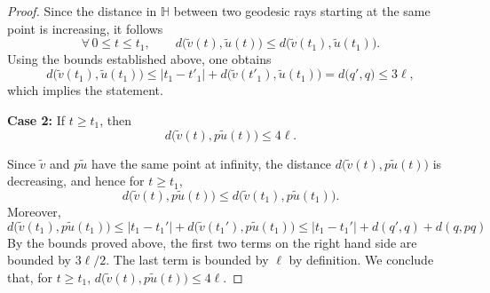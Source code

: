 \documentclass[a4paper,english,reqno]{amsart}
\theoremstyle{definition}
\numberwithin{equation}{section}
\begin{document}
\begin{proof}
 Since the distance in $\mathbb{H}$ between two geodesic rays starting at the same point is increasing, it follows 
 \[
  	\forall\,0\le t\le t_1,\qquad
  	d\bigl(\tilde v(t),\tilde u(t)\bigr)\le d\bigl(\tilde v(t_1),\tilde u(t_1)\bigr).
  	\]
Using the bounds established above, one obtains
 	\[
 	d\bigl(\tilde v(t_1),\tilde u(t_1)\bigr) \le 
 	|t_1 - t'_1 | + d\bigl(\tilde v(t'_1),\tilde u(t_1)\bigr) = d\bigl(q',q\bigr) \le
 	3\ell,
  	\]
which implies the statement.
 	
% 
 	
 	\smallskip
 	\noindent\textbf{Case 2:} If $ t\ge  t_1$, then 
 	\[
 	d\bigl(\tilde v(t), p \tilde u(t)\bigr)\le 4\ell.
 	\] 
 	
 	Since $\tilde v$ and $p \tilde u$ have the same point at infinity, the distance $d\bigl(\tilde v(t), p \tilde u(t)\bigr)$ is decreasing, and hence for $t\ge t_1$,
 	\[
 	d\bigl(\tilde v(t), p\tilde u(t)\bigr)
 	\le d\bigl(\tilde v(t_1),p \tilde u(t_1)\bigr).
 	\]
 	Moreover,
 	\[
 	d\bigl(\tilde v(t_1), p \tilde u(t_1)\bigr)
 	\le |t_1-t_1'| + d\bigl(\tilde v(t_1'), p \tilde u(t_1) \bigr) \le |t_1-t_1'| + d(q', q) + d(q,pq)
 	\]
 	By the bounds proved above, the first two terms on the right hand side are bounded by $3\ell/2$. The last term is bounded by $\ell$ by definition.
 	We conclude that, for $t\ge t_1$, $d\bigl(\tilde v(t), p \tilde u(t)\bigr)  \le 4\ell$. 
 	

\end{proof}
\end{document}
